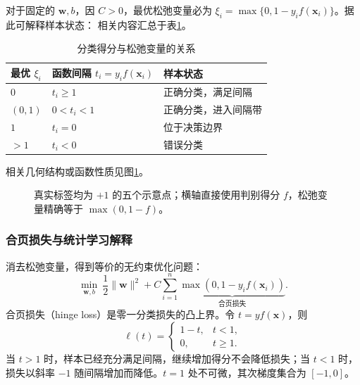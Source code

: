 对于固定的 $\boldsymbol w,b$，因 $C>0$，最优松弛变量必为
$\xi_i=\max\{0,1-y_if(\boldsymbol x_i)\}$。据此可解释样本状态：
相关内容汇总于表\ref{tab:svm-slack-states}。
\begin{table}[htbp]\centering
\caption{分类得分与松弛变量的关系}\label{tab:svm-slack-states}
\begin{tabular}{lll}\toprule
最优 $\xi_i$ & 函数间隔 $t_i=y_if(\boldsymbol x_i)$ & 样本状态\\\midrule
$0$ & $t_i\geq1$ & 正确分类，满足间隔\\
$(0,1)$ & $0<t_i<1$ & 正确分类，进入间隔带\\
$1$ & $t_i=0$ & 位于决策边界\\
$>1$ & $t_i<0$ & 错误分类\\\bottomrule
\end{tabular}
\end{table}

相关几何结构或函数性质见图\ref{fig:svm-slack}。
\begin{figure}[htbp]\centering
{}
\caption{真实标签均为 $+1$ 的五个示意点；横轴直接使用判别得分 $f$，松弛变量精确等于 $\max(0,1-f)$。}
\label{fig:svm-slack}
\end{figure}

\subsubsection{合页损失与统计学习解释}

消去松弛变量，得到等价的无约束优化问题：
\begin{equation}\label{eq:svm-hinge-objective}
\boxed{\min_{\boldsymbol w,b}\ 
\frac12\|\boldsymbol w\|^2+C\sum_{i=1}^n
\underbrace{\max(0,1-y_i f(\boldsymbol x_i))}_{\text{合页损失}}.}
\end{equation}
合页损失（hinge loss）是零一分类损失的凸上界。令 $t=yf(\boldsymbol x)$，则
\[
\ell(t)=\begin{cases}1-t,&t<1,\\0,&t\geq1.\end{cases}
\]
当 $t>1$ 时，样本已经充分满足间隔，继续增加得分不会降低损失；当 $t<1$ 时，损失以斜率 $-1$ 随间隔增加而降低。$t=1$ 处不可微，其次梯度集合为 $[-1,0]$。

